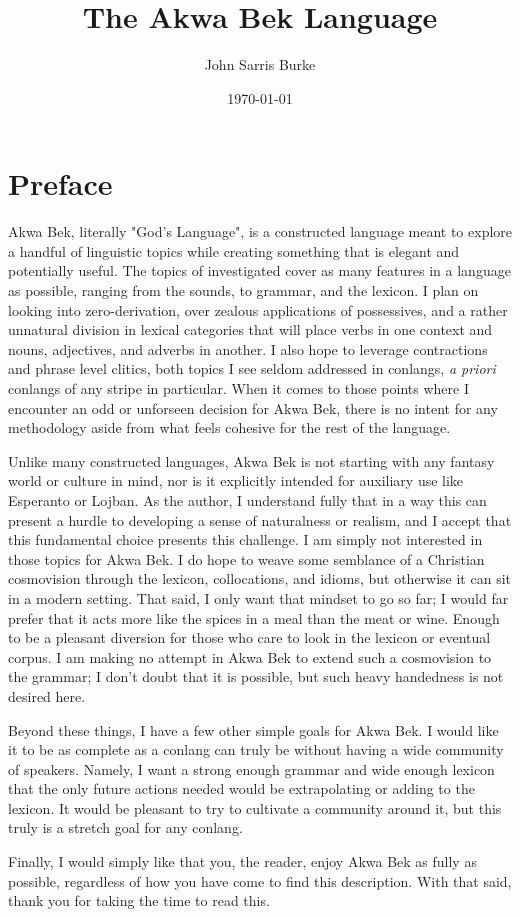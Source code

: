 \documentclass[11pt,letterpaper]{article}
\title{The Akwa Bek Language}
\date{\today}
\author{John Sarris Burke}
\begin{document}
\maketitle
\tableofcontents
\pagebreak
\pagebreak


\section{Preface}
  Akwa Bek, literally "God's Language", is a constructed language meant to explore a handful of linguistic topics while creating something that is elegant and potentially useful. The topics of investigated cover as many features in a language as possible, ranging from the sounds, to grammar, and the lexicon. I plan on looking into zero-derivation, over zealous applications of possessives, and a rather unnatural division in lexical categories that will place verbs in one context and nouns, adjectives, and adverbs in another. I also hope to leverage contractions and phrase level clitics, both topics I see seldom addressed in conlangs, \textit{a priori} conlangs of any stripe in particular. When it comes to those points where I encounter an odd or unforseen decision for Akwa Bek, there is no intent for any methodology aside from what feels cohesive for the rest of the language.
\par
  Unlike many constructed languages, Akwa Bek is not starting with any fantasy world or culture in mind, nor is it explicitly intended for auxiliary use like Esperanto or Lojban. As the author, I understand fully that in a way this can present a hurdle to developing a sense of naturalness or realism, and I accept that this fundamental choice presents this challenge. I am simply not interested in those topics for Akwa Bek. I do hope to weave some semblance of a Christian cosmovision through the lexicon, collocations, and idioms, but otherwise it can sit in a modern setting. That said, I only want that mindset to go so far; I would far prefer that it acts more like the spices in a meal than the meat or wine. Enough to be a pleasant diversion for those who care to look in the lexicon or eventual corpus. I am making no attempt in Akwa Bek to extend such a cosmovision to the grammar; I don't doubt that it is possible, but such heavy handedness is not desired here.
\par
  Beyond these things, I have a few other simple goals for Akwa Bek. I would like it to be as complete as a conlang can truly be without having a wide community of speakers. Namely, I want a strong enough grammar and wide enough lexicon that the only future actions needed would be extrapolating or adding to the lexicon. It would be pleasant to try to cultivate a community around it, but this truly is a stretch goal for any conlang.
\par
  Finally, I would simply like that you, the reader, enjoy Akwa Bek as fully as possible, regardless of how you have come to find this description. With that said, thank you for taking the time to read this.
\pagebreak
\end{document}
